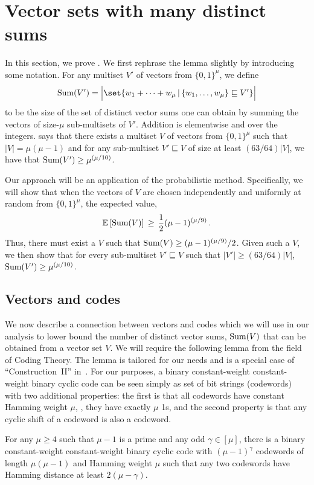 \documentclass{toc}
\newcommand{\Vsum}{\ensuremath{\textup{Sum}}}
\newcommand{\ELL}{\ensuremath{\mu}}
\newcommand{\expect}[1]{\mathbb{E}\left[{#1}\right]}
\begin{document}
\section{Vector sets with many distinct sums} \label{sec:proofvecsum}

In this section, we prove .
We first rephrase the lemma slightly by introducing some notation.
For any multiset $V'$ of vectors from $\{0,1\}^\ELL$, we define
\[
\Vsum(V') = \Big| \set{w_1 + \cdots + w_\ELL \,|\, \{w_1,\dots,w_\ELL\} \sqsubseteq  V'} \Big|
\]
to be the size of the  set of distinct vector sums one can obtain by summing the vectors of
%
size-$\mu$    %
sub-multisets of $V'$.
Addition is %
elementwise  %
and over the integers.
 says that there exists a multiset $V$ of vectors from     $\{0,1\}^\ELL$ such that $|V|=\ELL(\ELL-1)$ and for any sub-multiset $V'\sqsubseteq V$ of size at least $(63/64)|V|$, we have that $\Vsum(V') \geq \ELL^{(\ELL/10)}$.

Our approach will be an application of the probabilistic method. Specifically, we will show that when the vectors of $V$ are chosen independently and uniformly at random from  $\{0,1\}^\ELL$, the expected value,
\[
\expect{\Vsum(V)}\,\geq\, \frac12 (\ELL-1)^{(\ELL/9)}\,.
\]
Thus, there must exist a $V$ such that $\Vsum(V)\geq (\ELL-1)^{(\ELL/9)}/2$.
Given such a $V$, we then show that for every sub-multiset $V'\sqsubseteq  V$ such that $|V'| \geq (63/64)|V|$,
$\Vsum(V')\geq \ELL^{(\ELL/10)}$.


\subsection{Vectors and codes}

We now describe a connection between vectors and codes which we will use in our analysis to lower bound the number of distinct vector sums, $\Vsum(V)$ that can be obtained from a vector set $V$. We will require the following lemma from the field of Coding Theory.
The lemma is tailored for our needs and is a special
case of ``Construction~II'' in~\cite{AGM:1992}.
For our purposes, a
binary constant-weight  %
constant-weight binary  %
cyclic code can be seen simply as set of
%
%
bit strings   %
(codewords) with two additional properties: the first is that all codewords have constant Hamming weight $\ELL$, \ie, they have exactly $\ELL$ 1s, and the second property is that any cyclic shift of a codeword is also a codeword.

\begin{lemma}
	\label{lem:cyclic-code}
	For any $\ELL\geq 4$ such that $\ELL-1$ is a prime and any odd $\gamma\in[\ELL]$, there is a
binary constant-weight  %
constant-weight binary  %
cyclic code with $(\ELL-1)^{\gamma}$ codewords of length $\ELL(\ELL-1)$ and Hamming weight $\ELL$ such that any two codewords have Hamming distance at least $2(\ELL-\gamma)$.
\end{lemma}
\end{document}
